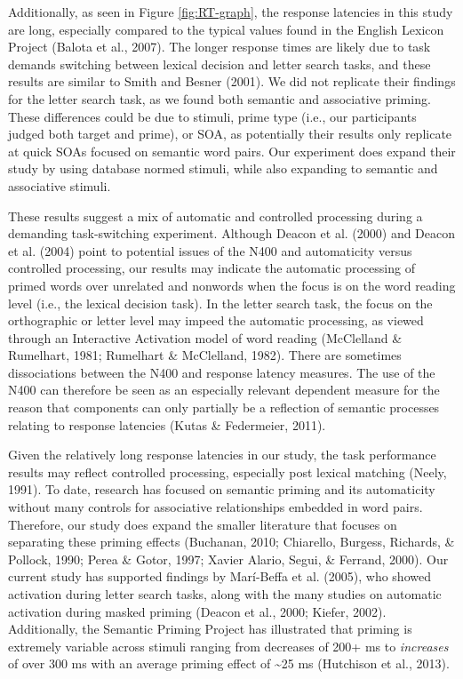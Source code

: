 \documentclass[english,man]{apa6}
\theoremstyle{definition}
\theoremstyle{definition}
\theoremstyle{definition}
\theoremstyle{remark}
\begin{document}
Additionally, as seen in Figure \ref{fig:RT-graph}, the response
latencies in this study are long, especially compared to the typical
values found in the English Lexicon Project (Balota et al., 2007). The
longer response times are likely due to task demands switching between
lexical decision and letter search tasks, and these results are similar
to Smith and Besner (2001). We did not replicate their findings for the
letter search task, as we found both semantic and associative priming.
These differences could be due to stimuli, prime type (i.e., our
participants judged both target and prime), or SOA, as potentially their
results only replicate at quick SOAs focused on semantic word pairs. Our
experiment does expand their study by using database normed stimuli,
while also expanding to semantic and associative stimuli.

These results suggest a mix of automatic and controlled processing
during a demanding task-switching experiment. Although Deacon et al.
(2000) and Deacon et al. (2004) point to potential issues of the N400
and automaticity versus controlled processing, our results may indicate
the automatic processing of primed words over unrelated and nonwords
when the focus is on the word reading level (i.e., the lexical decision
task). In the letter search task, the focus on the orthographic or
letter level may impeed the automatic processing, as viewed through an
Interactive Activation model of word reading (McClelland \& Rumelhart,
1981; Rumelhart \& McClelland, 1982). There are sometimes dissociations
between the N400 and response latency measures. The use of the N400 can
therefore be seen as an especially relevant dependent measure for the
reason that components can only partially be a reflection of semantic
processes relating to response latencies (Kutas \& Federmeier, 2011).

Given the relatively long response latencies in our study, the task
performance results may reflect controlled processing, especially post
lexical matching (Neely, 1991). To date, research has focused on
semantic priming and its automaticity without many controls for
associative relationships embedded in word pairs. Therefore, our study
does expand the smaller literature that focuses on separating these
priming effects (Buchanan, 2010; Chiarello, Burgess, Richards, \&
Pollock, 1990; Perea \& Gotor, 1997; Xavier Alario, Segui, \& Ferrand,
2000). Our current study has supported findings by Marí-Beffa et al.
(2005), who showed activation during letter search tasks, along with the
many studies on automatic activation during masked priming (Deacon et
al., 2000; Kiefer, 2002). Additionally, the Semantic Priming Project has
illustrated that priming is extremely variable across stimuli ranging
from decreases of 200+ ms to \emph{increases} of over 300 ms with an
average priming effect of \textasciitilde{}25 ms (Hutchison et al.,
2013).
\end{document}
